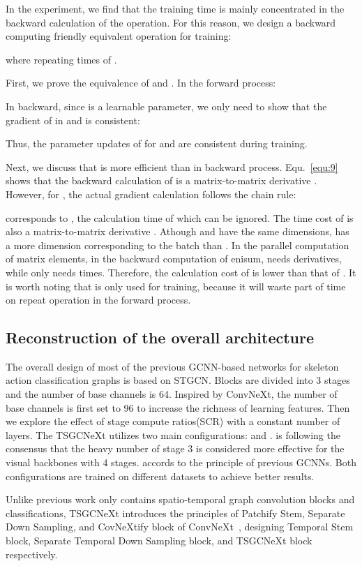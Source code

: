 \documentclass[10pt,twocolumn,letterpaper]{article}
\begin{document}
In the experiment, we find that the training time is mainly concentrated in the backward calculation of the operation. For this reason, we design a backward computing friendly equivalent operation for training:


where  repeating  times of . 

First, we prove the equivalence of  and . In the forward process:

In backward, since  is a learnable parameter, we only need to show that the gradient of  in  and  is consistent:

Thus, the parameter updates of  for  and  are consistent during training.

Next, we discuss that  is more efficient than  in backward process. Equ.~\ref{equ:9} shows that the backward calculation of  is  a matrix-to-matrix derivative . However, for , the actual gradient calculation follows the chain rule:

  corresponds to , the calculation time of which can be ignored. The time cost of  is also a matrix-to-matrix derivative .  Athough  and  have the same dimensions,   has a more dimension corresponding to the batch than .  In the parallel computation of matrix elements, in the backward computation of enisum,  needs  derivatives, while  only needs   times. Therefore, the calculation cost of  is lower than that of .  It is worth noting that  is only used for training, because it will waste part of time on repeat operation in the forward process. 

\subsection{Reconstruction of the overall architecture}
\label{ssec:architecture}
The overall design of most of the previous GCNN-based networks for skeleton action classification graphs is based on STGCN. Blocks are divided into 3 stages and the number of base channels is 64. Inspired by ConvNeXt, the number of base channels is first set to 96 to increase the richness of learning features. Then we explore the effect of stage compute ratios(SCR) with a constant number of layers. The TSGCNeXt utilizes two main configurations:  and .  is following the consensus that the heavy number of stage 3 is considered more effective for the visual backbones with 4 stages.  accords to the principle of previous GCNNs. Both configurations are trained on different datasets to achieve better results.

Unlike previous work only contains spatio-temporal graph convolution blocks and classifications, TSGCNeXt introduces the principles of Patchify Stem, Separate Down Sampling, and CovNeXtify block of ConvNeXt~\cite{liu2022convnet}, designing Temporal Stem block, Separate Temporal Down Sampling block, and TSGCNeXt block respectively.
\end{document}
